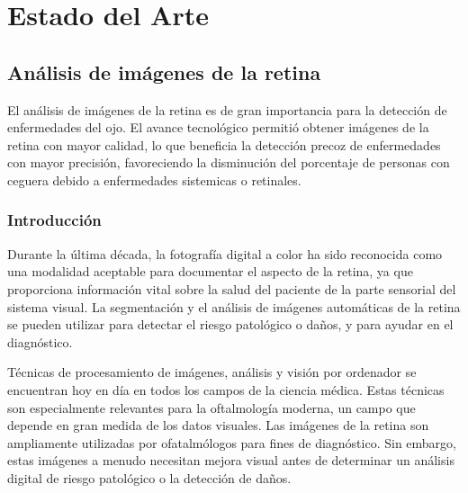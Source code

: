 
\chapter{Estado del Arte} %

\label{Chapter2} %


\section{An\'alisis de im\'agenes de la retina}

El an\'alisis de im\'agenes de la retina es de gran importancia para la detecci\'on de enfermedades del ojo.
El avance tecnol\'ogico permiti\'o obtener im\'agenes de la retina con mayor calidad, lo que beneficia la detecci\'on precoz de enfermedades con mayor precisi\'on, favoreciendo la disminuci\'on del porcentaje de personas con ceguera debido a enfermedades sistemicas o retinales. 

\subsection{Introducci\'on}

Durante la \'ultima d\'ecada, la fotograf\'ia digital a color ha sido reconocida como una modalidad aceptable para documentar el aspecto de la retina, ya que proporciona informaci\'on vital sobre la salud del paciente de la parte sensorial del sistema visual. La segmentaci\'on y el an\'alisis de im\'agenes autom\'aticas de la retina se pueden utilizar para detectar el riesgo patol\'ogico o da\~nos, y para ayudar en el diagn\'ostico. 

T\'ecnicas de procesamiento de imágenes, análisis y visión por ordenador se encuentran hoy en d\'ia en todos los campos de la ciencia m\'edica. Estas técnicas son especialmente relevantes para la oftalmología moderna, un campo que depende en gran medida de los datos visuales. Las im\'agenes de la retina son ampliamente utilizadas por ofatalm\'ologos para fines de diagn\'ostico. Sin embargo, estas im\'agenes a menudo necesitan mejora visual antes de determinar un an\'alisis digital de riesgo patol\'ogico o la detecci\'on de da\~nos.

